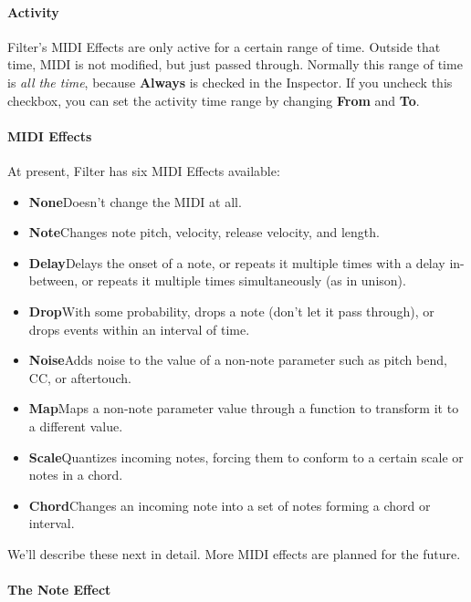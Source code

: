 \documentclass[twoside,10pt]{article}
\begin{document}
\paragraph{Activity}

Filter's MIDI Effects are only active for a certain range of time.  Outside that time, MIDI is not modified, but just passed through.   Normally this range of time is {\it all the time}, because {\bf Always} is checked in the Inspector.  If you uncheck this checkbox, you can set the activity time range by changing {\bf From} and {\bf To}.  

\paragraph{MIDI Effects}

At present, Filter has six MIDI Effects available:

\begin{itemize}
\item {\bf None}\qquad Doesn't change the MIDI at all.
\item {\bf Note}\qquad Changes note pitch, velocity, release velocity, and length.
\item {\bf Delay}\qquad Delays the onset of a note, or repeats it multiple times with a delay in-between, or repeats it multiple times simultaneously (as in unison).
\item {\bf Drop}\qquad With some probability, drops a note (don't let it pass through), or drops events within an interval of time.
\item {\bf Noise}\qquad Adds noise to the value of a non-note parameter such as pitch bend, CC, or aftertouch.
\item {\bf Map}\qquad Maps a non-note parameter value through a function to transform it to a different value.
\item {\bf Scale}\qquad Quantizes incoming notes, forcing them to conform to a certain scale or notes in a chord.
\item {\bf Chord}\qquad Changes an incoming note into a set of notes forming a chord or interval.
\end{itemize}

We'll describe these next in detail.  More MIDI effects are planned for the future.

\paragraph{The Note Effect}
\end{document}
